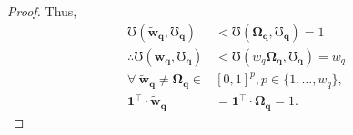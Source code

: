 \documentclass[hidelinks, nonatbib]{elsarticle}
\begin{document}
\begin{lemma}
\begin{proof}
        Thus, 
        \begin{align}
            \mho(
                \boldsymbol{\tilde{w}_{q}},
                \boldsymbol{\mho_q}
            ) 
            &< 
            \mho(
                \boldsymbol{\Omega_{q}},
                \boldsymbol{\mho_q}
            ) 
            = 1
            \\
            \therefore
            \mho(
                \boldsymbol{w_{q}},
                \boldsymbol{\mho_q}
            )
            &< 
            \mho(
                w_{q}
                \boldsymbol{\Omega_{q}},
                \boldsymbol{\mho_q}
            ) 
            = w_q
            \\
            \forall
            \
            \boldsymbol{\tilde{w}_{q}}
            \neq
            \boldsymbol{\Omega_{q}}
            \in
            &
            [0,1]^{p}
            ,
            p \in \{1, \dots, w_q\}
            ,
            \\
            \boldsymbol{1} ^ {\top}
            \cdot
            \boldsymbol{\tilde{w}_{q}}
            &=
            \boldsymbol{1} ^ {\top}
            \cdot
            \boldsymbol{\Omega_{q}}
            = 1
            .
        \end{align}
        
            

\end{proof}
\end{lemma}
\end{document}
